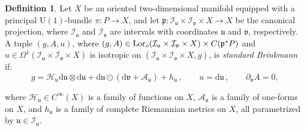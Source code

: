 \documentclass[10pt,a4paper,twoside,reqno]{amsart}
\theoremstyle{plain}
\theoremstyle{definition}
\newtheorem{definition}[thm]{Definition}
\theoremstyle{remark}
\def\dd{\mathrm{d}}
\def\cH{\mathcal{H}}
\def\U{\mathrm{U}}
\def\cA{\mathcal{A}}
\def\cI{\mathcal{I}}
\newcommand{\Lor}{{\rm Lor}}
\def\cH{\mathcal{H}}
\def\dd{\mathrm{d}}
\def\fru{\mathfrak{u}}
\def\frv{\mathfrak{v}}
\begin{document}
\begin{definition}
Let $X$ be an oriented two-dimensional manifold equipped with a principal $\U(1)$-bundle $\pi \colon P\to X$, and let $\mathfrak{p} \colon \cI_\fru\times \cI_\frv \times X \to X$ be the canonical projection, where $\cI_\fru$ and $\cI_\frv$ are intervals with coordinates $\fru$ and $\frv$, respectively. A tuple $(g,A,u)$, where $(g,A) \in \Lor_o(\cI_\fru\times \cI_\frv \times X)\times C(\mathfrak{p}^{\ast}P)$ and $u\in \Omega^1(\cI_\fru\times\cI_\frv\times X)$ is isotropic on $(\cI_\fru \times\cI_\frv\times X,g)$, is \emph{standard Brinkmann} if:
\begin{equation}
\label{eq:standardBrinkmann}
g = \cH_{\fru} \dd \fru \otimes \dd \fru +  \dd \fru \odot (\dd \frv + \cA_{\fru}) + h_{\fru}\, , \qquad  u = \dd \fru\, , \qquad \partial_{\frv}A = 0,
\end{equation}

\noindent
where $\cH_{\fru} \in C^{\infty}(X)$ is a family of functions on $X$, $\cA_{\fru}$ is a family of one-forms on $X$, and $h_{\fru}$ is a family of complete Riemannian metrics on $X$, all parametrized by $\fru\in \cI_{\fru}$.   
\end{definition}
\end{document}
